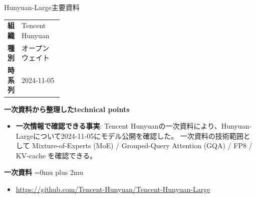 \begin{technicalnote}{Hunyuan-Large}{主要資料}
\begingroup
\begin{tabularx}{\linewidth}{@{}>{\bfseries}p{0.22\linewidth}X@{}}
組織 & Tencent Hunyuan \\
種別 & オープンウェイト \\
時系列 & 2024-11-05 \\
\end{tabularx}
\smallskip
{\bfseries 一次資料から整理したtechnical points}
\begin{itemize}[leftmargin=1.5em,itemsep=0.35em]
\item \textbf{一次情報で確認できる事実}: Tencent Hunyuanの一次資料により、Hunyuan-Largeについて2024-11-05にモデル公開を確認した。 一次資料の技術範囲として Mixture-of-Experts (MoE) / Grouped-Query Attention (GQA) / FP8 / KV-cache を確認できる。
\end{itemize}
\begin{minipage}{\linewidth}
\begin{samepage}
{\bfseries 一次資料}
\begingroup\sloppy
\Urlmuskip=0mu plus 2mu\relax
\begin{itemize}[leftmargin=1.5em,itemsep=0.25em]
\item {\scriptsize\url{https://github.com/Tencent-Hunyuan/Tencent-Hunyuan-Large}}
\end{itemize}
\endgroup
\end{samepage}
\end{minipage}
\endgroup
\end{technicalnote}
\medskip

